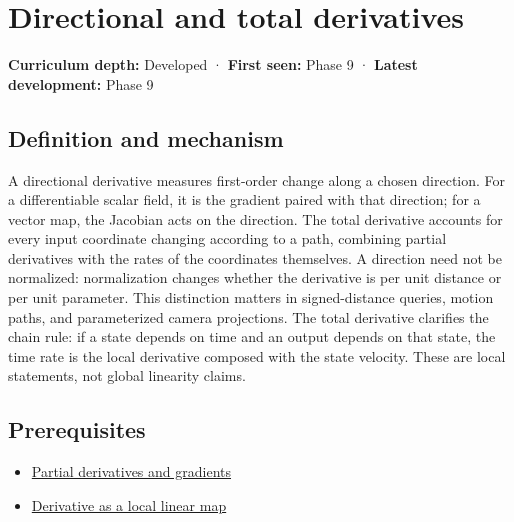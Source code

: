 \hypertarget{appendix-e2d476574aab}{}\label{referencestart:appendix-e2d476574aab}
\section{Directional and total derivatives}\label{appendix-e2d476574aab-directional-and-total-derivatives}

\textbf{Curriculum depth:} Developed · \textbf{First seen:} Phase 9 · \textbf{Latest development:} Phase 9

\begin{allmightroledefinition}

\subsection{Definition and mechanism}\label{appendix-e2d476574aab-definition-and-mechanism}

A directional derivative measures first-order change along a chosen direction. For a differentiable scalar field, it is the gradient paired with that direction; for a vector map, the Jacobian acts on the direction. The total derivative accounts for every input coordinate changing according to a path, combining partial derivatives with the rates of the coordinates themselves. A direction need not be normalized: normalization changes whether the derivative is per unit distance or per unit parameter. This distinction matters in signed-distance queries, motion paths, and parameterized camera projections. The total derivative clarifies the chain rule: if a state depends on time and an output depends on that state, the time rate is the local derivative composed with the state velocity. These are local statements, not global linearity claims.

\end{allmightroledefinition}

\subsection{Prerequisites}\label{appendix-e2d476574aab-prerequisites}

\begin{itemize}
\tightlist
\item
  \hyperref[appendix-677b59746ae0]{Partial derivatives and gradients}
\item
  \hyperref[appendix-7bc181935c42]{Derivative as a local linear map}
\end{itemize}


